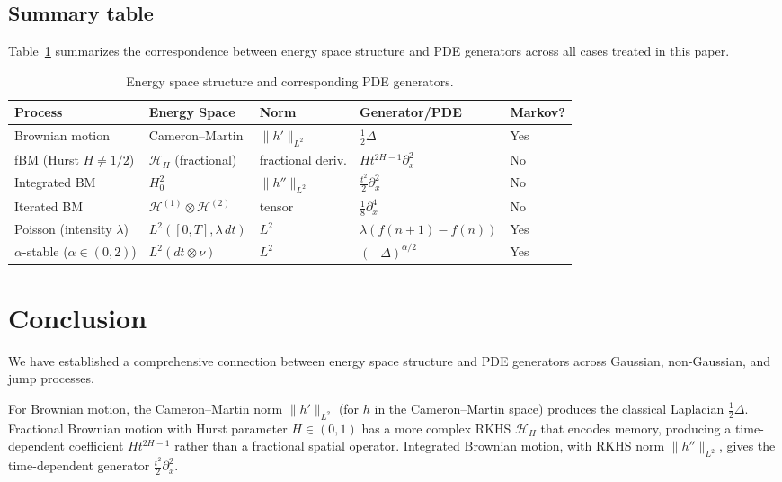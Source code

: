 \documentclass[12pt]{article}
\theoremstyle{plain}
\theoremstyle{definition}
\theoremstyle{remark}
\newcommand{\HH}{\mathcal{H}}
\begin{document}
\subsection{Summary table}

Table~\ref{tab:summary} summarizes the correspondence between energy space structure and PDE generators across all cases treated in this paper.

\begin{table}[ht]
\centering
\renewcommand{\arraystretch}{1.3}
\begin{tabular}{@{}lllll@{}}
\toprule
\textbf{Process} & \textbf{Energy Space} & \textbf{Norm} & \textbf{Generator/PDE} & \textbf{Markov?} \\
\midrule
Brownian motion & Cameron--Martin & $\|h'\|_{L^2}$ & $\frac{1}{2}\Delta$ & Yes \\[2pt]
fBM (Hurst $H \neq 1/2$) & $\HH_H$ (fractional) & fractional deriv. & $Ht^{2H-1}\partial_x^2$ & No \\[2pt]
Integrated BM & $H_0^2$ & $\|h''\|_{L^2}$ & $\frac{t^2}{2}\partial_x^2$ & No \\[2pt]
Iterated BM & $\HH^{(1)} \otimes \HH^{(2)}$ & tensor & $\frac{1}{8}\partial_x^4$ & No \\[2pt]
Poisson (intensity $\lambda$) & $L^2([0,T], \lambda\,dt)$ & $L^2$ & $\lambda(f(n+1) - f(n))$ & Yes \\[2pt]
$\alpha$-stable ($\alpha \in (0,2)$) & $L^2(dt \otimes \nu)$ & $L^2$ & $(-\Delta)^{\alpha/2}$ & Yes \\
\bottomrule
\end{tabular}
\caption{Energy space structure and corresponding PDE generators.}
\label{tab:summary}
\end{table}

\section{Conclusion}\label{sec:conclusion}

We have established a comprehensive connection between energy space structure and PDE generators across Gaussian, non-Gaussian, and jump processes.

For Brownian motion, the Cameron--Martin norm $\|h'\|_{L^2}$ (for $h$ in the Cameron--Martin space) produces the classical Laplacian $\frac{1}{2}\Delta$. Fractional Brownian motion with Hurst parameter $H \in (0,1)$ has a more complex RKHS $\HH_H$ that encodes memory, producing a time-dependent coefficient $Ht^{2H-1}$ rather than a fractional spatial operator. Integrated Brownian motion, with RKHS norm $\|h''\|_{L^2}$, gives the time-dependent generator $\frac{t^2}{2}\partial_x^2$.
\end{document}
